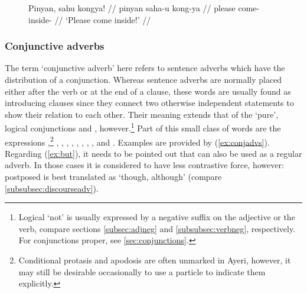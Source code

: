 \begin{figure}[h]
\ex\label{ex:request}
\begingl
	\gla Pinyan, sahu kongya! //
	\glb pinyan saha-u kong-ya //
	\glc please come-\Imp{} inside-\Loc{} //
	\glft `Please come inside!' //
\endgl
\xe
\end{figure}

\subsubsection{Conjunctive adverbs}
\label{subsubsec:conjadv}

The term `conjunctive adverb' here refers to sentence adverbs which have the
distribution of a conjunction. Whereas sentence adverbs are normally placed
either after the verb or at the end of a clause, these words are usually found
as introducing clauses since they connect two otherwise independent statements
to show their relation to each other. Their meaning extends that of the
`pure', logical conjunctions  and ,
however.\footnote{Logical `not' is usually expressed by a negative suffix on
the adjective or the verb, compare sections \ref{subsec:adjneg} and
\ref{subsubsec:verbneg}, respectively. For conjunctions proper, see
\autoref{sec:conjunctions}.} Part of this small class of words are the
expressions ,\footnote{Conditional protasis and
apodosis are often unmarked in Ayeri, however, it may still be desirable
occasionally to use a particle to indicate them explicitly.}
,
,
,
,
,
,
,
, and 
. Examples are provided by
(\ref{ex:conjadvs}). Regarding (\ref{ex:but}), it needs to be pointed out that
 can also be used as a regular adverb. In those cases it is
considered to have less contrastive force, however: postposed
 is best translated as `though, although' (compare
\autoref{subsubsec:discourseadv}).


